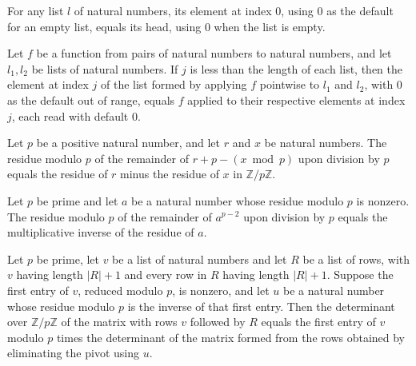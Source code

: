 \begin{theorem}
\label{Complexity.BinArith.getD_zero_eq_headD}
\leanok
{}
For any list $l$ of natural numbers, its element at index $0$, using $0$ as the default
for an empty list, equals its head, using $0$ when the list is empty.
\end{theorem}

\begin{theorem}
\label{Complexity.BinArith.getD_zipWith}
\leanok
{}
Let $f$ be a function from pairs of natural numbers to natural numbers, and let
$l_1,l_2$ be lists of natural numbers. If $j$ is less than the length of each list, then
the element at index $j$ of the list formed by applying $f$ pointwise to $l_1$ and
$l_2$, with $0$ as the default out of range, equals $f$ applied to their respective
elements at index $j$, each read with default $0$.
\end{theorem}

\begin{theorem}
\label{Complexity.BinArith.natCast_sub_mod}
\leanok
{}
Let $p$ be a positive natural number, and let $r$ and $x$ be natural numbers. The
residue modulo $p$ of the remainder of $r+p-(x\bmod p)$ upon division by $p$ equals the
residue of $r$ minus the residue of $x$ in $\mathbb{Z}/p\mathbb{Z}$.
\end{theorem}

\begin{theorem}
\label{Complexity.BinArith.natCast_pow_mod_eq_inv}
\leanok
{}
Let $p$ be prime and let $a$ be a natural number whose residue modulo $p$ is nonzero.
The residue modulo $p$ of the remainder of $a^{p-2}$ upon division by $p$ equals the
multiplicative inverse of the residue of $a$.
\end{theorem}

\begin{theorem}
\label{Complexity.BinArith.det_matOfRows_elim}
\leanok
{}
Let $p$ be prime, let $v$ be a list of natural numbers and let $R$ be a list of rows,
with $v$ having length $|R|+1$ and every row in $R$ having length $|R|+1$. Suppose the
first entry of $v$, reduced modulo $p$, is nonzero, and let $u$ be a natural number
whose residue modulo $p$ is the inverse of that first entry. Then the determinant over
$\mathbb{Z}/p\mathbb{Z}$ of the matrix with rows $v$ followed by $R$ equals the first entry of $v$
modulo $p$ times the determinant of the matrix formed from the rows obtained by
eliminating the pivot using $u$.
\end{theorem}

